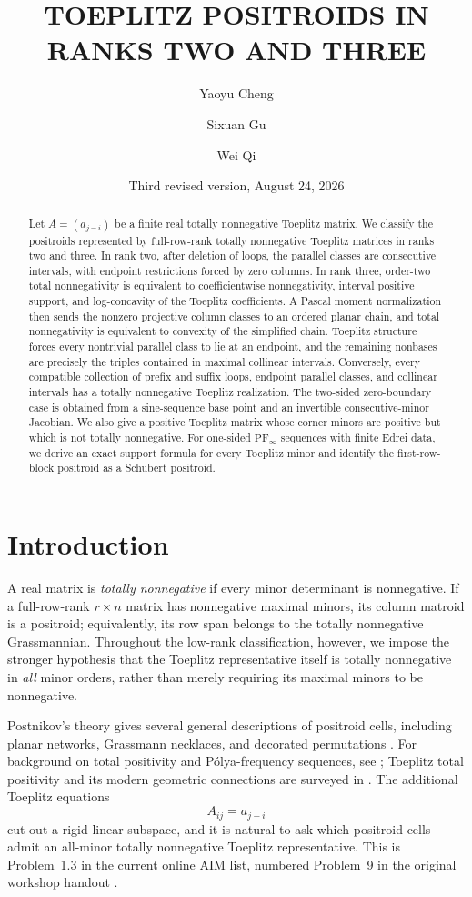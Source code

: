 \documentclass{amsart}
\title{TOEPLITZ POSITROIDS IN RANKS TWO AND THREE}
\date{Third revised version, August 24, 2026}
\author{Yaoyu Cheng}
\author{Sixuan Gu}
\author{Wei Qi}
\numberwithin{equation}{section}
\theoremstyle{definition}
\theoremstyle{remark}
\newcommand{\PFinfty}{\mathrm{PF}_{\infty}}
\begin{document}
\begin{abstract}
Let $A=(a_{j-i})$ be a finite real totally nonnegative Toeplitz matrix.  We classify the positroids represented by full-row-rank totally nonnegative Toeplitz matrices in ranks two and three.  In rank two, after deletion of loops, the parallel classes are consecutive intervals, with endpoint restrictions forced by zero columns.  In rank three, order-two total nonnegativity is equivalent to coefficientwise nonnegativity, interval positive support, and log-concavity of the Toeplitz coefficients.  A Pascal moment normalization then sends the nonzero projective column classes to an ordered planar chain, and total nonnegativity is equivalent to convexity of the simplified chain.  Toeplitz structure forces every nontrivial parallel class to lie at an endpoint, and the remaining nonbases are precisely the triples contained in maximal collinear intervals.  Conversely, every compatible collection of prefix and suffix loops, endpoint parallel classes, and collinear intervals has a totally nonnegative Toeplitz realization.  The two-sided zero-boundary case is obtained from a sine-sequence base point and an invertible consecutive-minor Jacobian.  We also give a positive Toeplitz matrix whose corner minors are positive but which is not totally nonnegative.  For one-sided $\PFinfty$ sequences with finite Edrei data, we derive an exact support formula for every Toeplitz minor and identify the first-row-block positroid as a Schubert positroid.
\end{abstract}

\maketitle

\section{Introduction}

A real matrix is \emph{totally nonnegative} if every minor determinant is nonnegative.  If a full-row-rank $r\times n$ matrix has nonnegative maximal minors, its column matroid is a positroid; equivalently, its row span belongs to the totally nonnegative Grassmannian.  Throughout the low-rank classification, however, we impose the stronger hypothesis that the Toeplitz representative itself is totally nonnegative in \emph{all} minor orders, rather than merely requiring its maximal minors to be nonnegative.

Postnikov's theory gives several general descriptions of positroid cells, including planar networks, Grassmann necklaces, and decorated permutations \cite{Postnikov}.  For background on total positivity and P\'olya-frequency sequences, see \cite{Karlin,FJ}; Toeplitz total positivity and its modern geometric connections are surveyed in \cite{Rietsch,RietschSurvey}.  The additional Toeplitz equations
\[
 A_{ij}=a_{j-i}
\]
cut out a rigid linear subspace, and it is natural to ask which positroid cells admit an all-minor totally nonnegative Toeplitz representative.  This is Problem~1.3 in the current online AIM list, numbered Problem~9 in the original workshop handout \cite{AIM}.
\end{document}

